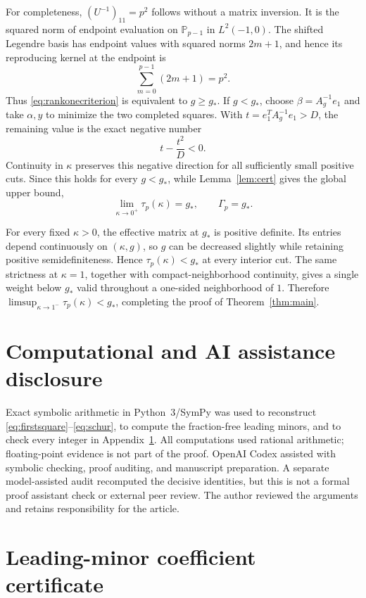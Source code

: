 \documentclass[11pt]{article}
\newcommand{\PP}{\mathbb P}
\begin{document}
For completeness, $(U^{-1})_{11}=p^2$ follows without a matrix
inversion.  It is the squared norm of endpoint evaluation on
$\PP_{p-1}$ in $L^2(-1,0)$.  The shifted Legendre basis has endpoint
values with squared norms $2m+1$, and hence its reproducing kernel at
the endpoint is
\[
 \sum_{m=0}^{p-1}(2m+1)=p^2.
\]
Thus \eqref{eq:rankonecriterion} is equivalent to $g\ge g_*$.  If
$g<g_*$, choose $\beta=A_g^{-1}e_1$ and take $\alpha,y$ to minimize the
two completed squares.  With $t=e_1^TA_g^{-1}e_1>D$, the remaining
value is the exact negative number
\[
 t-\frac{t^2}{D}<0.
\]
Continuity in $\kappa$ preserves this negative direction for all
sufficiently small positive cuts.  Since this holds for every $g<g_*$,
while Lemma~\ref{lem:cert} gives the global upper bound,
\[
 \lim_{\kappa\to0^+}\tau_p(\kappa)=g_*,
 \qquad \Gamma_p=g_*.
\]

For every fixed $\kappa>0$, the effective matrix at $g_*$ is positive
definite.  Its entries depend continuously on $(\kappa,g)$, so $g$ can
be decreased slightly while retaining positive semidefiniteness.  Hence
$\tau_p(\kappa)<g_*$ at every interior cut.  The same strictness at
$\kappa=1$, together with compact-neighborhood continuity, gives a
single weight below $g_*$ valid throughout a one-sided neighborhood of
$1$.  Therefore
$\limsup_{\kappa\to1^-}\tau_p(\kappa)<g_*$, completing the proof of
Theorem~\ref{thm:main}.

\section*{Computational and AI assistance disclosure}

Exact symbolic arithmetic in Python~3/SymPy was used to reconstruct
\eqref{eq:firstsquare}--\eqref{eq:schur}, to compute the fraction-free
leading minors, and to check every integer in Appendix~\ref{app:data}.
All computations used rational arithmetic; floating-point evidence is
not part of the proof.  OpenAI Codex assisted with symbolic checking,
proof auditing, and manuscript preparation.  A separate model-assisted
audit recomputed the decisive identities, but this is not a formal proof
assistant check or external peer review.  The author reviewed the
arguments and retains responsibility for the article.

\appendix
\section{Leading-minor coefficient certificate}\label{app:data}
\end{document}
